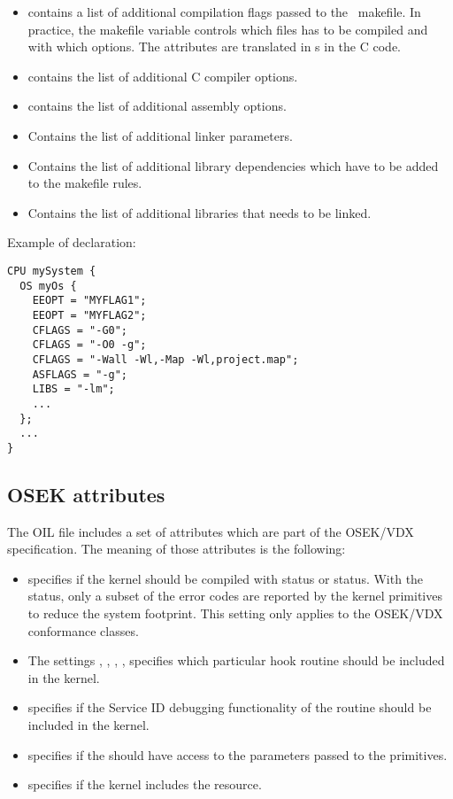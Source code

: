 \begin{itemize}
\item {} contains a list of additional compilation flags
  passed to the \ee\ makefile. In practice, the 
  makefile variable controls which files has to be compiled and with
  which options. The  attributes are translated in
  s in the C code.
\item {} contains the list of additional C compiler options.
\item {} contains the list of additional assembly options.
\item {} Contains the list of additional linker parameters.
\item {} Contains the list of additional library
  dependencies which have to be added to the makefile rules.
\item {} Contains the list of additional libraries that needs
  to be linked.
\end{itemize}

Example of declaration:

\begin{lstlisting}
CPU mySystem {
  OS myOs {
    EEOPT = "MYFLAG1";
    EEOPT = "MYFLAG2";
    CFLAGS = "-G0";
    CFLAGS = "-O0 -g";
    CFLAGS = "-Wall -Wl,-Map -Wl,project.map";
    ASFLAGS = "-g";
    LIBS = "-lm";
    ...
  };
  ...
}
\end{lstlisting}

\subsection{OSEK attributes}
The OIL file includes a set of attributes which are part of the
OSEK/VDX specification. The meaning of those attributes is the
following:

\begin{itemize}
\item {} specifies if the kernel should be compiled with
   status or  status. With the
   status, only a subset of the error codes are 
  reported by the kernel primitives to reduce the system footprint. 
  This setting only applies to the OSEK/VDX conformance classes.
\item The settings , ,
  , ,  specifies
  which particular hook routine should be included in the kernel.
\item {} specifies if the Service ID debugging
  functionality of the  routine should be included in
  the kernel.
\item {} specifies if the 
  should have access to the parameters passed to the primitives.
\item {} specifies if the kernel includes the
   resource.
\end{itemize}

